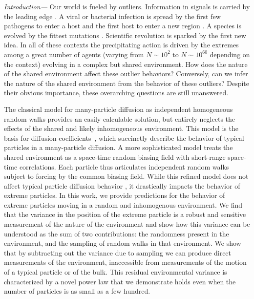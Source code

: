 \documentclass[%
 reprint,
 amsmath,amssymb,
 longbibliography,
 aps,
prl
]{revtex4-1}
\begin{document}
\noindent\emph{Introduction---}
Our world is fueled by outliers. Information in signals is carried by the leading edge \cite{saxtonSingleparticleTrackingApplications1997a,pintoPhysicsTypeIa2000, hoflingAnomalousTransportCrowded2013a, ghoshNonuniversalTracerDiffusion2015, manzoReviewProgressSingle2015, iyer-biswasFirstPassageProcesses2016,metzlerNonBrownianDiffusionLipid2016c,  shenSingleParticleTracking2017}.
A viral or bacterial infection is spread by the first few pathogens to enter a host and the first host to enter a new region \cite{hufnagelForecastControlEpidemics2004a,kaoVirusDiffusionIsolation2006b}.
A species is evolved by the fittest mutations \cite{ewensMathematicalPopulationGenetics2012, metzlerFirstpassagePhenomenaTheir2014,waxmanDiffusionEquationRandom2017}. Scientific revolution is sparked by the first new idea. In all of these contexts the precipitating action is driven by the extremes among a great number of agents (varying from $N\sim 10^2$ to $N\sim 10^{60}$ depending on the context) evolving in a complex but shared environment. How does the nature of the shared environment affect these outlier behaviors? Conversely, can we infer the nature of the shared environment from the behavior of these outliers?  Despite their obvious importance, these overarching questions are still unanswered.

The classical model for many-particle diffusion as independent homogeneous random walks provides an easily calculable solution, but entirely neglects the effects of the shared and likely inhomogeneous environment. This model is the basis for diffusion coefficients~\cite{einsteinUberMolekularkinetischenTheorie1905b,einsteinZurTheorieBrownschen1906a, einsteinTheoretischeBemerkungenUber1907a}, which succinctly describe the behavior of typical particles in a many-particle diffusion. A more sophisticated model treats the shared environment as a space-time random biasing field with short-range space-time correlations. Each particle thus articulates independent random walks subject to forcing by the common biasing field. While this refined model does not affect typical particle diffusion behavior \cite{rassoul-aghaQuenchedFreeEnergy2013}, it drastically impacts the behavior of extreme particles. In this work, we provide predictions for the behavior of extreme particles moving in a random and inhomogenous environment.
We find that the variance in the position of the extreme particle is a robust and sensitive measurement of the nature of the environment and show how this variance can be understood as the sum of two contributions: the randomness present in the environment, and the sampling of random walks in that environment.  We show that by subtracting out the variance due to sampling we can produce direct measurements of the environment, inaccessible from measurements of the motion of a typical particle or of the bulk. This residual environmental variance is characterized by a novel power law that we demonstrate holds even when the number of particles is as small as a few hundred.
\end{document}
